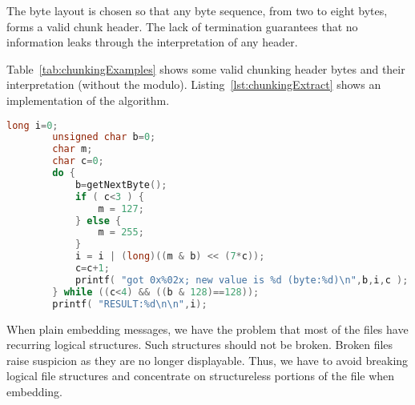The byte layout is chosen so that any byte sequence, from two to eight bytes, forms a valid chunk header. The lack of termination guarantees that no information leaks through the interpretation of any header.

Table~\ref{tab:chunkingExamples} shows some valid chunking header bytes and their interpretation (without the modulo). Listing~\ref{lst:chunkingExtract} shows an implementation of the algorithm.

\begin{lstfloat}[ht]
	\begin{lstlisting}[language=c]
		long i=0;
		unsigned char b=0;
		char m;
		char c=0;
		do {
			b=getNextByte();
			if ( c<3 ) {
				m = 127;
			} else {
				m = 255;
			}
			i = i | (long)((m & b) << (7*c));
			c=c+1;
			printf( "got 0x%02x; new value is %d (byte:%d)\n",b,i,c );
		} while ((c<4) && ((b & 128)==128));
		printf( "RESULT:%d\n\n",i);
	\end{lstlisting}
	\caption{Reference implementation for extraction of a chunking value in C}
	\label{lst:chunkingExtract}
\end{lstfloat}


When plain embedding messages, we have the problem that most of the files have recurring logical structures. Such structures should not be broken. Broken files raise suspicion as they are no longer displayable. Thus, we have to avoid breaking logical file structures and concentrate on structureless portions of the file when embedding. %

